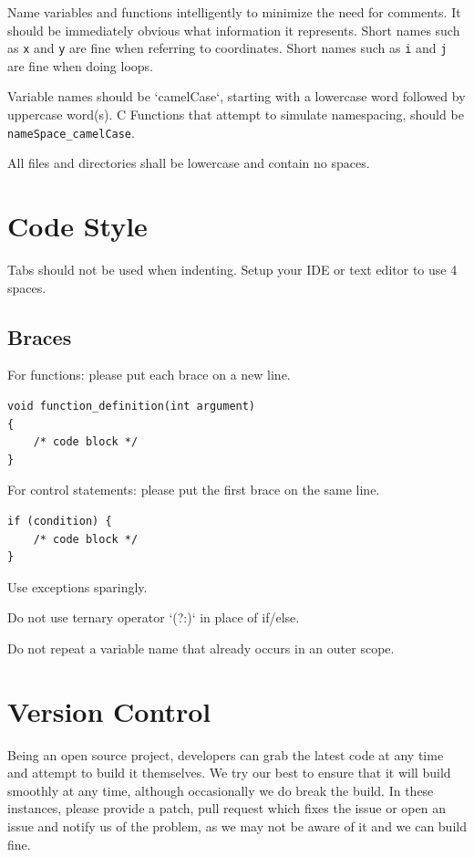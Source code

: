\documentclass{report}
\begin{document}
Name variables and functions intelligently to minimize the need for comments. It should be immediately obvious what information it represents. Short names such as \texttt{x} and \texttt{y} are fine when referring to coordinates. Short names such as \texttt{i} and \texttt{j} are fine when doing loops.

Variable names should be `camelCase`, starting with a lowercase word followed by uppercase word(s). C Functions that attempt to simulate namespacing, should be \texttt{nameSpace\_camelCase}.

All files and directories shall be lowercase and contain no spaces.

\section{Code Style}

Tabs should not be used when indenting. Setup your IDE or text editor to use 4 spaces.

\subsection{Braces}

For functions: please put each brace on a new line.

\begin{lstlisting}
void function_definition(int argument)
{
    /* code block */
}
\end{lstlisting}

For control statements: please put the first brace on the same line.

\begin{lstlisting}
if (condition) {
    /* code block */    
}
\end{lstlisting}

Use exceptions sparingly.

Do not use ternary operator `(?:)` in place of if/else.

Do not repeat a variable name that already occurs in an outer scope.

\section{Version Control}

Being an open source project, developers can grab the latest code at any time and attempt to build it themselves. We try our best to ensure that it will build smoothly at any time, although occasionally we do break the build. In these instances, please provide a patch, pull request which fixes the issue or open an issue and notify us of the problem, as we may not be aware of it and we can build fine.
\end{document}
